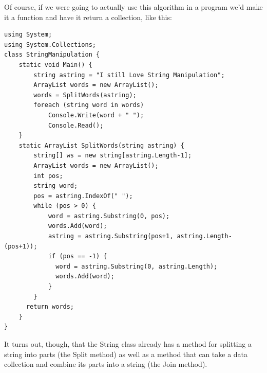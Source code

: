 \documentclass[12pt,a4paper,final,twoside,titlepage]{book}
\begin{document}
Of course, if we were going to actually use this algorithm in a program we’d make it a function and have it return a collection, like this:
\begin{lstlisting}
using System;
using System.Collections;
class StringManipulation {
	static void Main() {
		string astring = "I still Love String Manipulation";
      	ArrayList words = new ArrayList();
      	words = SplitWords(astring);
      	foreach (string word in words)
        	Console.Write(word + " ");
      		Console.Read();
	}
	static ArrayList SplitWords(string astring) { 
		string[] ws = new string[astring.Length-1]; 
		ArrayList words = new ArrayList();
		int pos;
		string word;
		pos = astring.IndexOf(" "); 
		while (pos > 0) {
	        word = astring.Substring(0, pos);
    	    words.Add(word);
        	astring = astring.Substring(pos+1, astring.Length-(pos+1)); 
        	if (pos == -1) {
	          word = astring.Substring(0, astring.Length);
    	      words.Add(word);
			}
		}
      return words;
	}
}
\end{lstlisting}
It turns out, though, that the String class already has a method for splitting a string into parts (the Split method) as well as a method that can take a data collection and combine its parts into a string (the Join method).
\end{document}

